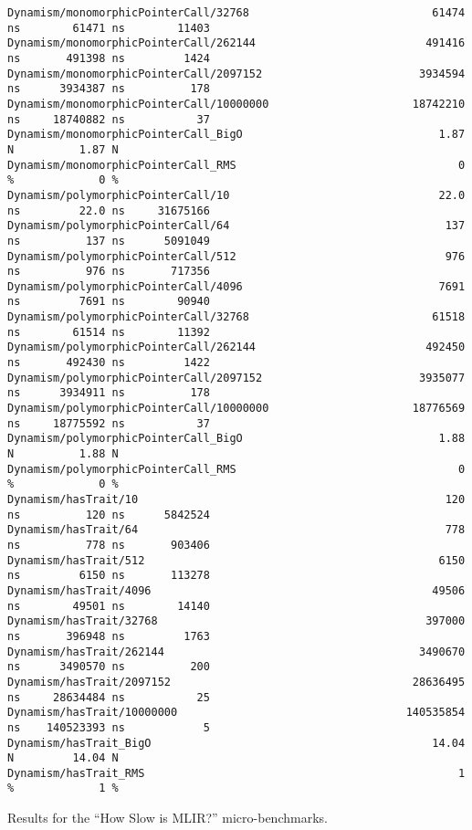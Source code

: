 \begin{code}
\begin{verbatim}
Dynamism/monomorphicPointerCall/32768                            61474 ns        61471 ns        11403
Dynamism/monomorphicPointerCall/262144                          491416 ns       491398 ns         1424
Dynamism/monomorphicPointerCall/2097152                        3934594 ns      3934387 ns          178
Dynamism/monomorphicPointerCall/10000000                      18742210 ns     18740882 ns           37
Dynamism/monomorphicPointerCall_BigO                              1.87 N          1.87 N
Dynamism/monomorphicPointerCall_RMS                                  0 %             0 %
Dynamism/polymorphicPointerCall/10                                22.0 ns         22.0 ns     31675166
Dynamism/polymorphicPointerCall/64                                 137 ns          137 ns      5091049
Dynamism/polymorphicPointerCall/512                                976 ns          976 ns       717356
Dynamism/polymorphicPointerCall/4096                              7691 ns         7691 ns        90940
Dynamism/polymorphicPointerCall/32768                            61518 ns        61514 ns        11392
Dynamism/polymorphicPointerCall/262144                          492450 ns       492430 ns         1422
Dynamism/polymorphicPointerCall/2097152                        3935077 ns      3934911 ns          178
Dynamism/polymorphicPointerCall/10000000                      18776569 ns     18775592 ns           37
Dynamism/polymorphicPointerCall_BigO                              1.88 N          1.88 N
Dynamism/polymorphicPointerCall_RMS                                  0 %             0 %
Dynamism/hasTrait/10                                               120 ns          120 ns      5842524
Dynamism/hasTrait/64                                               778 ns          778 ns       903406
Dynamism/hasTrait/512                                             6150 ns         6150 ns       113278
Dynamism/hasTrait/4096                                           49506 ns        49501 ns        14140
Dynamism/hasTrait/32768                                         397000 ns       396948 ns         1763
Dynamism/hasTrait/262144                                       3490670 ns      3490570 ns          200
Dynamism/hasTrait/2097152                                     28636495 ns     28634484 ns           25
Dynamism/hasTrait/10000000                                   140535854 ns    140523393 ns            5
Dynamism/hasTrait_BigO                                           14.04 N         14.04 N
Dynamism/hasTrait_RMS                                                1 %             1 %
    \end{verbatim}
    \caption{Results for the ``How Slow is MLIR?'' micro-benchmarks.}
    \label{listing:how-slow-is-mlir-microbenchmark-results}
\end{code}
